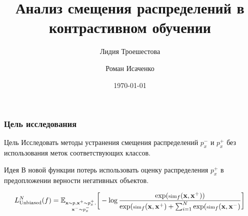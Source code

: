 \documentclass[
	11pt, %
]{beamer}
\title[]{Анализ смещения распределений в контрастивном обучении} %
\author[Лидия Троешестова \and Роман Исаченко]{Лидия Троешестова \and Роман Исаченко} %
\institute[]{МФТИ} %
\date[\today]{\today} %
\begin{document}

\begin{frame}
	\titlepage %
\end{frame}




\begin{frame}
	\frametitle{Цель исследования}

\begin{block}{Цель}
Исследовать методы устранения смещения распределений $p_x^-$ и $p_x^+$ без использования меток соответствующих классов.
\end{block}

\begin{block}{Идея}
В новой функции потерь использовать оценку распределения $p_x^+$ в предопложении верности негативных объектов.
\end{block}

\begin{equation*} \small
L_{\text{Unbiased}}^N(f) = \mathbb{E}_{\substack{\mathbf{x} \sim p, \mathbf{x^+} \sim p^+_x,\\ \mathbf{x^-} \sim p_x^-}} \bigg[-\log \frac{\exp (\scriptsize\text{sim}_f(\mathbf{x}, \mathbf{x^+}))}{\exp (\scriptsize\text{sim}_f(\mathbf{x}, \mathbf{x^+}) + \sum _{i=1}^N \exp (\scriptsize\text{sim}_f(\mathbf{x}, \mathbf{x^-})}\bigg]
\end{equation*}

\end{frame}
\end{document}
